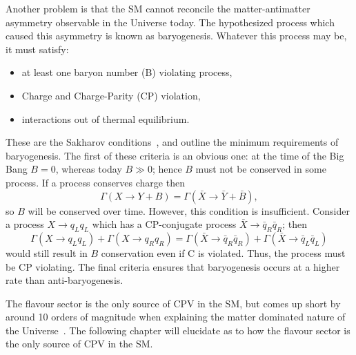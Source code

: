 Another problem is that the SM cannot reconcile the matter-antimatter asymmetry observable in the
Universe today.
The hypothesized process which caused this asymmetry is known as baryogenesis.
Whatever this process may be, it must satisfy:
\begin{itemize}
  \item at least one baryon number (B) violating process,
  \item Charge and Charge-Parity (CP) violation,
  \item interactions out of thermal equilibrium.
\end{itemize}
These are the Sakharov conditions~\cite{1991SvPhU..34..392S}, and outline the minimum requirements
of baryogenesis.
The first of these criteria is an obvious one: at the time of the Big Bang $B=0$, whereas today
$B\gg0$; hence $B$ must not be conserved in some process.
If a process conserves charge then
\begin{equation}
  \Gamma(X\to Y+B)=\Gamma(\bar X \to \bar Y+\bar B),
\end{equation}
so $B$ will be conserved over time.
However, this condition is insufficient.
Consider a process $X\to q_Lq_L$ which has a CP-conjugate process $\bar X\to \bar q_R\bar q_R$;
then
\begin{equation}
  \Gamma(X\to q_Lq_L) + \Gamma(X\to q_Rq_R)
  =
  \Gamma(\bar X\to \bar q_R\bar q_R) + \Gamma(\bar X\to \bar q_L\bar q_L)
\end{equation}
would still result in $B$ conservation even if C is violated.
Thus, the process must be CP violating.
The final criteria ensures that baryogenesis occurs at a higher rate than anti-baryogenesis.

The flavour sector is the only source of CPV in the SM, but comes up short by around 10 orders of
magnitude when explaining the matter dominated nature of the Universe~\cite{Cline:2006ts,Huet:1994jb}.
The following chapter will elucidate as to how the flavour sector is the only source of CPV in the
SM.




